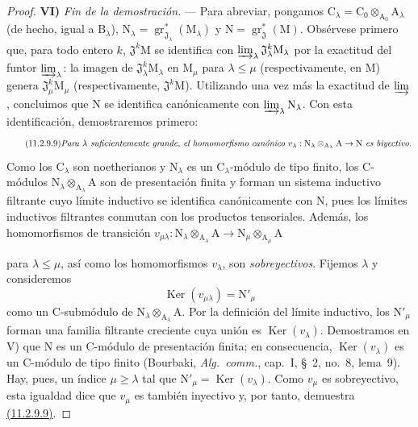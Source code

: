 \begin{proof}
\medskip
\noindent\textbf{VI)} \emph{Fin de la demostración.} --- Para abreviar, pongamos $\mathrm{C}_\lambda=\mathrm{C}_0\otimes_{\mathrm{A}_0}\mathrm{A}_\lambda$ (de hecho, igual a $\mathrm{B}_\lambda$), $\mathrm{N}_\lambda=\operatorname{gr}^*_{\mathfrak{J}_\lambda}(\mathrm{M}_\lambda)$ y $\mathrm{N}=\operatorname{gr}^*_\mathfrak{J}(\mathrm{M})$. Obsérvese primero que, para todo entero $k$, $\mathfrak{J}^k\mathrm{M}$ se identifica con $\varinjlim_\lambda\mathfrak{J}_\lambda^k\mathrm{M}_\lambda$ por la exactitud del funtor $\varinjlim_\lambda$: la imagen de $\mathfrak{J}_\lambda^k\mathrm{M}_\lambda$ en $\mathrm{M}_\mu$ para $\lambda\leqslant\mu$ (respectivamente, en $\mathrm{M}$) genera $\mathfrak{J}_\mu^k\mathrm{M}_\mu$ (respectivamente, $\mathfrak{J}^k\mathrm{M}$). Utilizando una vez más la exactitud de $\varinjlim$, concluimos que $\mathrm{N}$ se identifica canónicamente con $\varinjlim_\lambda\mathrm{N}_\lambda$. Con esta identificación, demostraremos primero:
\begin{equation}
\label{IV.11.2.9.9}
\tag{11.2.9.9}
\text{\emph{Para $\lambda$ suficientemente grande, el homomorfismo canónico $v_\lambda:\mathrm{N}_\lambda\otimes_{\mathrm{A}_\lambda}\mathrm{A}\to\mathrm{N}$ es biyectivo.}}
\end{equation}
Como los $\mathrm{C}_\lambda$ son noetherianos y $\mathrm{N}_\lambda$ es un $\mathrm{C}_\lambda$-módulo de tipo finito, los $\mathrm{C}$-módulos $\mathrm{N}_\lambda\otimes_{\mathrm{A}_\lambda}\mathrm{A}$ son de presentación finita y forman un sistema inductivo filtrante cuyo límite inductivo se identifica canónicamente con $\mathrm{N}$, pues los límites inductivos filtrantes conmutan con los productos tensoriales. Además, los homomorfismos de transición $v_{\mu\lambda}:\mathrm{N}_\lambda\otimes_{\mathrm{A}_\lambda}\mathrm{A}\to\mathrm{N}_\mu\otimes_{\mathrm{A}_\mu}\mathrm{A}$


para $\lambda\leqslant\mu$, así como los homomorfismos $v_\lambda$, son
\emph{sobreyectivos}. Fijemos $\lambda$ y consideremos
\[
  \operatorname{Ker}(v_{\mu\lambda})=\mathrm{N}'_\mu
\]
como un $\mathrm{C}$-submódulo de
$\mathrm{N}_\lambda\otimes_{\mathrm{A}_\lambda}\mathrm{A}$. Por la
definición del límite inductivo, los $\mathrm{N}'_\mu$ forman una
familia filtrante creciente cuya unión es $\operatorname{Ker}(v_\lambda)$.
Demostramos en V) que $\mathrm{N}$ es un $\mathrm{C}$-módulo de presentación finita;
en consecuencia, $\operatorname{Ker}(v_\lambda)$ es un $\mathrm{C}$-módulo de tipo finito
(Bourbaki, \emph{Alg.\ comm.}, cap.~I, \S~2, no.~8, lema~9).
Hay, pues, un índice $\mu\geqslant\lambda$ tal que
$\mathrm{N}'_\mu=\operatorname{Ker}(v_\lambda)$. Como $v_\mu$ es
sobreyectivo, esta igualdad dice que $v_\mu$ es también inyectivo y,
por tanto, demuestra {\hyperlink{ega4.c04.thm.11-2-9}{(11.2.9.9)}}.


\end{proof}
